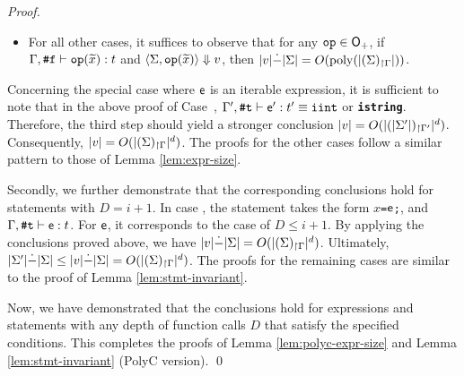\documentclass[runningheads]{llncs}
\begin{document}
\begin{proof}
\begin{itemize}
\begin{itemize}
        \begin{equation}
            \size{\Sigma'}\dot{-}\size{\Sigma}=O(\size{\restr{\Sigma}{\Gamma}}^{\max\{d',d''\}}).
        \end{equation}
        \item In the end, we have $\size{v}\le\size{\Sigma'}+O(\size{\restr{\size{\Sigma'}}{\Gamma'}}^{d'''})$ for some $d'''$ by the induction hypothesis.
        By Proposition \ref{prop:invariant}, $\size{\restr{\Sigma'}{\Gamma'}}=\size{\restr{\emptyset[\widetilde{x}\mapsto\widetilde{v}]}{\emptyset[\widetilde{x}\mapsto\widetilde{t}]}}$.
        Hence, $\size{v}\le\size{\Sigma}+O(\size{\restr{\Sigma}{\Gamma}}^{d})$, where $d:=\max\{d',d'',d'''\}$ is a constant.
    \end{itemize}
    \item For all other cases, it suffices to observe that for any $\mathtt{op}\in\mathsf{O}_{+}$, if $\Gamma,\texttt{\#}\mathtt{f}\vdash\mathtt{op}(\widetilde{x}):t$ and $\langle\Sigma,\mathtt{op}(\widetilde{x})\rangle\Downarrow{v}$, then $\vert v\vert\dot{-}\vert\Sigma\vert=O(\mathrm{poly}(\vert{(\Sigma)_{\restriction \Gamma}}\vert))$.
\end{itemize}

Concerning the special case where $\mathsf{e}$ is an iterable expression, it is sufficient to note that in the above proof of Case~, $\Gamma',\texttt{\#}\mathtt{t}\vdash\mathsf{e}':t'\equiv{\mathtt{iint}}$ or \texttt{\textbf{istring}}.
Therefore, the third step should yield a stronger conclusion $\vert v\vert=O(\vert{(\vert\Sigma'\vert)_{\restriction \Gamma'}}\vert^{d})$.
Consequently, $\vert v\vert=O(\vert{(\Sigma)_{\restriction \Gamma}}\vert^{d})$.
The proofs for the other cases follow a similar pattern to those of Lemma \ref{lem:expr-size}.

Secondly, we further demonstrate that the corresponding conclusions hold for statements with $D=i+1$.
In case , the statement takes the form \texttt{$x$=$\mathsf{e}$;}, and $\Gamma,\texttt{\#}\mathtt{t}\vdash\mathsf{e}:t$. For $\mathsf{e}$, it corresponds to the case of $D\leq i+1$. By applying the conclusions proved above, we have $\vert v\vert\dot{-}\vert\Sigma\vert=O(\vert{(\Sigma)_{\restriction \Gamma}}\vert^{d})$. Ultimately, $\vert\Sigma'\vert\dot{-}\vert\Sigma\vert\leq\vert v\vert\dot{-}\vert\Sigma\vert=O(\vert{(\Sigma)_{\restriction \Gamma}}\vert^{d})$.
The proofs for the remaining cases are similar to the proof of Lemma \ref{lem:stmt-invariant}.

Now, we have demonstrated that the conclusions hold for expressions and statements with any depth of function calls $D$ that satisfy the specified conditions. This completes the proofs of Lemma \ref{lem:polyc-expr-size} and Lemma \ref{lem:stmt-invariant} (PolyC version).
\qed
\end{proof}
\end{document}
